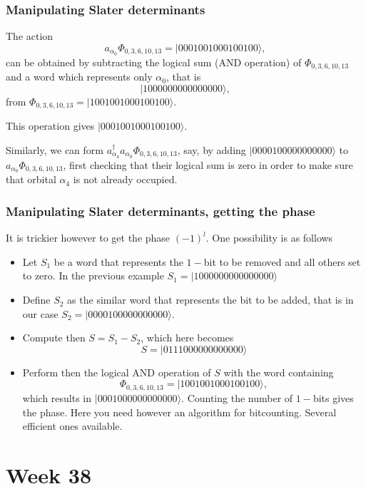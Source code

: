 \frame
{
  \frametitle{Manipulating Slater determinants}
\begin{small}
{\scriptsize
The action
\[
a_{\alpha_0}\Phi_{0,3,6,10,13} = |0001001000100100\rangle,
\]
can be obtained by subtracting the logical sum (AND operation) of $\Phi_{0,3,6,10,13}$ and 
a word which represents only $\alpha_0$, that is
\[
|1000000000000000\rangle,
\]  
from $\Phi_{0,3,6,10,13}= |1001001000100100\rangle$.

This operation gives $|0001001000100100\rangle$. 

Similarly, we can form $a^\dagger_{\alpha_4}a_{\alpha_0}\Phi_{0,3,6,10,13}$, say, by adding 
$|0000100000000000\rangle$ to $a_{\alpha_0}\Phi_{0,3,6,10,13}$, first checking that their logical sum
is zero in order to make sure that orbital $\alpha_4$ is not already occupied. 
}
\end{small}
}


\frame
{
  \frametitle{Manipulating Slater determinants, getting the phase}
\begin{small}
{\scriptsize
It is trickier however to get the phase $(-1)^l$. 
One possibility is as follows
\begin{itemize}
\item Let $S_1$ be a word that represents the $1-$bit to be removed and all others set to zero.
In the previous example $S_1=|1000000000000000\rangle$
\item Define $S_2$ as the similar word that represents the bit to be added, that is in our case
$S_2=|0000100000000000\rangle$.
\item Compute then $S=S_1-S_2$, which here becomes
\[
S=|0111000000000000\rangle
\]
\item Perform then the logical AND operation of $S$ with the word containing 
\[
\Phi_{0,3,6,10,13} = |1001001000100100\rangle,
\]
which results in $|0001000000000000\rangle$. Counting the number of $1-$bits gives the phase.  Here you need however an algorithm for bitcounting. Several efficient ones available. 
\end{itemize}
}
\end{small}
}



\section[Week 38]{Week 38}


